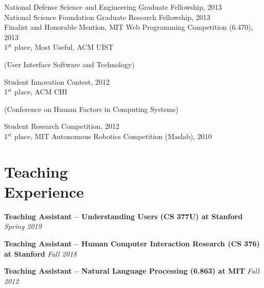 \documentclass[margin,line]{resume}
\begin{document}
\begin{resume}
National Defense Science and Engineering Graduate Fellowship, 2013\\ %
National Science Foundation Graduate Research Fellowship, 2013\\ %
Finalist and Honorable Mention, MIT Web Programming Competition (6.470), 2013\\ %
1$^{\textrm{st}}$ place, Most Useful, ACM UIST \begin{small}(User Interface Software and Technology)\end{small} Student Innovation Contest, 2012\\
1$^{\textrm{st}}$ place, ACM CHI \begin{small}(Conference on Human Factors in Computing Systems)\end{small} Student Research Competition, 2012\\
1$^{\textrm{st}}$ place, MIT Autonomous Robotics Competition (Maslab), 2010

\section{\mysidestyle Teaching\\Experience}

\textbf{Teaching Assistant -- Understanding Users (CS 377U) at Stanford} \hfill \textsl{Spring 2019} \\

\vspace{-8mm}

\textbf{Teaching Assistant -- Human Computer Interaction Research (CS 376) at Stanford} \hfill \textsl{Fall 2018} \\

\vspace{-8mm}

\textbf{Teaching Assistant -- Natural Language Processing (6.863) at MIT} \hfill \textsl{Fall 2012} \\


\end{resume}
\end{document}
